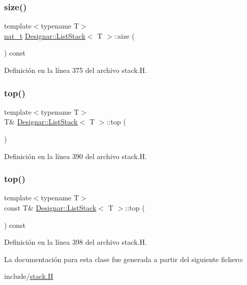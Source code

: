 \subsubsection{\texorpdfstring{size()}{size()}}
{\footnotesize\ttfamily template$<$typename T$>$ \\
\hyperlink{namespace_designar_aa72662848b9f4815e7bf31a7cf3e33d1}{nat\+\_\+t} \hyperlink{class_designar_1_1_list_stack}{Designar\+::\+List\+Stack}$<$ T $>$\+::size (\begin{DoxyParamCaption}{ }\end{DoxyParamCaption}) const\hspace{0.3cm}{\ttfamily [inline]}}



Definición en la línea 375 del archivo stack.\+H.

\mbox{\label{class_designar_1_1_list_stack_a5b6e47be80da93039d31cd885e97cf34}} 
\subsubsection{\texorpdfstring{top()}{top()}\hspace{0.1cm}{\footnotesize\ttfamily [1/2]}}
{\footnotesize\ttfamily template$<$typename T$>$ \\
T\& \hyperlink{class_designar_1_1_list_stack}{Designar\+::\+List\+Stack}$<$ T $>$\+::top (\begin{DoxyParamCaption}{ }\end{DoxyParamCaption})\hspace{0.3cm}{\ttfamily [inline]}}



Definición en la línea 390 del archivo stack.\+H.

\mbox{\label{class_designar_1_1_list_stack_a6eafdfa1a1a43b4cbbe27730a7dcffd3}} 
\subsubsection{\texorpdfstring{top()}{top()}\hspace{0.1cm}{\footnotesize\ttfamily [2/2]}}
{\footnotesize\ttfamily template$<$typename T$>$ \\
const T\& \hyperlink{class_designar_1_1_list_stack}{Designar\+::\+List\+Stack}$<$ T $>$\+::top (\begin{DoxyParamCaption}{ }\end{DoxyParamCaption}) const\hspace{0.3cm}{\ttfamily [inline]}}



Definición en la línea 398 del archivo stack.\+H.



La documentación para esta clase fue generada a partir del siguiente fichero\+:\begin{DoxyCompactItemize}
\item 
include/\hyperlink{stack_8_h}{stack.\+H}\end{DoxyCompactItemize}
